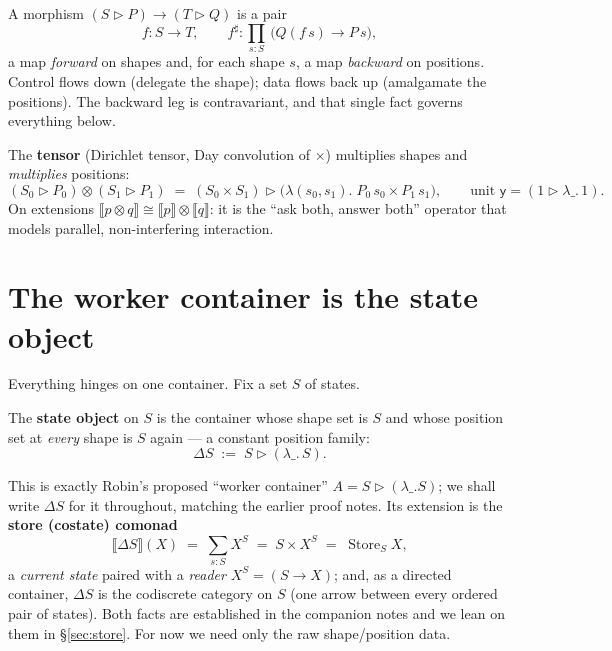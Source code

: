 \documentclass[11pt]{article}
\newcommand{\ctr}{\mathbin{\triangleright}}      %
\newcommand{\ext}[1]{\llbracket #1 \rrbracket}    %
\newcommand{\bk}[1]{{#1}^{\sharp}}                %
\newcommand{\y}{\mathsf{y}}
\DeclareMathOperator{\Store}{Store}
\theoremstyle{plain}
\theoremstyle{definition}
\begin{document}
\begin{defbox}
A morphism $(S \ctr P) \to (T \ctr Q)$ is a pair
\[
  f : S \to T,
  \qquad
  \bk f : \textstyle\prod_{s:S}\, \big(Q(f\,s) \to P\,s\big),
\]
a map \emph{forward} on shapes and, for each shape $s$, a map \emph{backward} on positions.
Control flows down (delegate the shape); data flows back up (amalgamate the positions). The backward
leg is contravariant, and that single fact governs everything below.
\end{defbox}

\begin{defbox}
The \textbf{tensor} (Dirichlet tensor, Day convolution of $\times$) multiplies shapes and
\emph{multiplies} positions:
\[
  (S_0 \ctr P_0)\otimes(S_1 \ctr P_1)
  \;=\; (S_0\times S_1)\ctr\big(\lambda(s_0,s_1).\; P_0\,s_0 \times P_1\,s_1\big),
  \qquad \text{unit } \y=(1\ctr\lambda\_.\,1).
\]
On extensions $\ext{p\otimes q}\cong\ext{p}\otimes\ext{q}$: it is the ``ask both, answer both''
operator that models parallel, non-interfering interaction.
\end{defbox}

\section{The worker container is the state object}\label{sec:state}

Everything hinges on one container. Fix a set $S$ of states.

\begin{defbox}
The \textbf{state object} on $S$ is the container whose shape set is $S$ and whose position set at
\emph{every} shape is $S$ again --- a constant position family:
\[
  \Delta S \;:=\; S \ctr (\lambda\_.\,S).
\]
\end{defbox}

\noindent This is exactly Robin's proposed ``worker container'' $A = S\ctr(\lambda\_.S)$; we shall
write $\Delta S$ for it throughout, matching the earlier proof notes. Its extension is the
\textbf{store (costate) comonad}
\[
  \ext{\Delta S}(X) \;=\; \textstyle\sum_{s:S} X^{S} \;=\; S \times X^{S}
  \;=\; \Store_S X,
\]
a \emph{current state} paired with a \emph{reader} $X^S = (S\to X)$; and, as a directed container,
$\Delta S$ is the codiscrete category on $S$ (one arrow between every ordered pair of states).
Both facts are established in the companion notes and we lean on them in \S\ref{sec:store}. For now
we need only the raw shape/position data.
\end{document}
